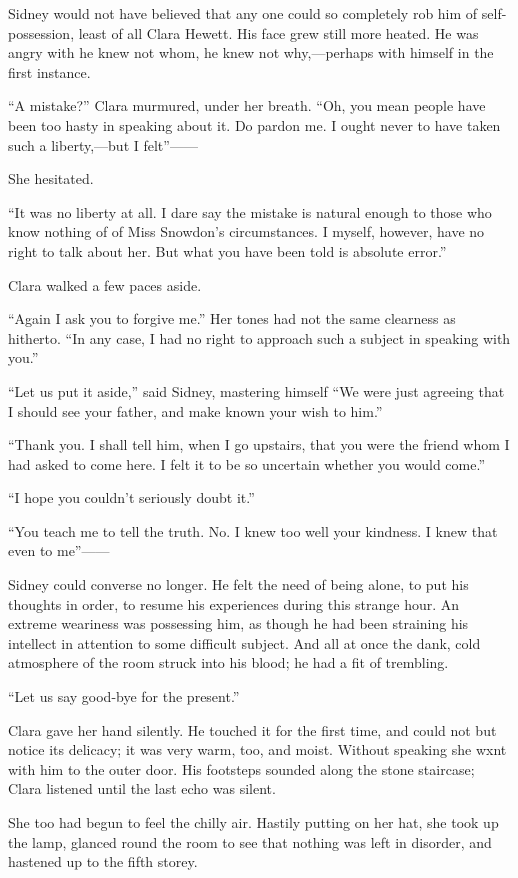 Sidney would not have believed that any one could so completely rob him
of self-possession, least of all Clara Hewett. His face grew still more
heated. He was angry with he knew not whom, he knew not why,---perhaps
with himself in the first instance.

``A mistake?'' Clara murmured, under her breath. ``Oh, you mean people
have been too hasty in speaking about it. Do pardon me. {}I ought never
to have taken such a liberty,---but I felt''{{------}}

She hesitated.

``It was no liberty at all. I dare say the mistake is natural enough to
those who know nothing of of Miss Snowdon's circumstances. I myself,
however, have no right to talk about her. But what you have been told is
absolute error.''

Clara walked a few paces aside.

``Again I ask you to forgive me.'' Her tones had not the same clearness
as hitherto. ``In any case, I had no right to approach such a subject in
speaking with you.''

``Let us put it aside,'' said Sidney, mastering himself ``We were just
agreeing that I should see your father, and make known your wish to
him.''

``Thank you. I shall tell him, when I go upstairs, that you were the
friend whom I had asked to come here. I felt it to be so uncertain
whether you would come.''

``I hope you couldn't seriously doubt it.''

``You teach me to tell the truth. No. I knew too well your kindness. I
knew that even to me''{{------}}

{}Sidney could converse no longer. He felt the need of being alone, to
put his thoughts in order, to resume his experiences during this strange
hour. An extreme weariness was possessing him, as though he had been
straining his intellect in attention to some difficult subject. And all
at once the dank, cold atmosphere of the room struck into his blood; he
had a fit of trembling.

``Let us say good-bye for the present.''

Clara gave her hand silently. He touched it for the first time, and
could not but notice its delicacy; it was very warm, too, and moist.
Without speaking she wxnt with him to the outer door. His footsteps
sounded along the stone staircase; Clara listened until the last echo
was silent.

She too had begun to feel the chilly air. Hastily putting on her hat,
she took up the lamp, glanced round the room to see that nothing was
left in disorder, and hastened up to the fifth storey.

